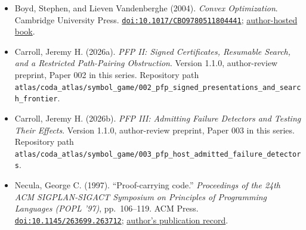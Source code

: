 \documentclass[
  11pt,
]{article}
\providecommand{\tightlist}{%
  \setlength{\itemsep}{0pt}\setlength{\parskip}{0pt}}
\begin{document}
\begin{itemize}
\tightlist
\item
  Boyd, Stephen, and Lieven Vandenberghe (2004). \emph{Convex
  Optimization}. Cambridge University Press.
  \href{https://doi.org/10.1017/CBO9780511804441}{\nolinkurl{doi:10.1017/CBO9780511804441}};
  \href{https://web.stanford.edu/~boyd/cvxbook/}{author-hosted book}.
\item
  Carroll, Jeremy H. (2026a). \emph{PFP II: Signed Certificates,
  Resumable Search, and a Restricted Path-Pairing Obstruction}. Version
  1.1.0, author-review preprint, Paper 002 in this series. Repository
  path
  \nolinkurl{atlas/coda_atlas/symbol_game/002_pfp_signed_presentations_and_search_frontier}.
\item
  Carroll, Jeremy H. (2026b). \emph{PFP III: Admitting Failure Detectors
  and Testing Their Effects}. Version 1.1.0, author-review preprint,
  Paper 003 in this series. Repository path
  \nolinkurl{atlas/coda_atlas/symbol_game/003_pfp_host_admitted_failure_detectors}.
\item
  Necula, George C. (1997). ``Proof-carrying code.'' \emph{Proceedings
  of the 24th ACM SIGPLAN-SIGACT Symposium on Principles of Programming
  Languages (POPL '97)}, pp.~106--119. ACM Press.
  \href{https://doi.org/10.1145/263699.263712}{\nolinkurl{doi:10.1145/263699.263712}};
  \href{https://people.eecs.berkeley.edu/~necula/papers.html}{author's
  publication record}.
\end{itemize}
\end{document}
